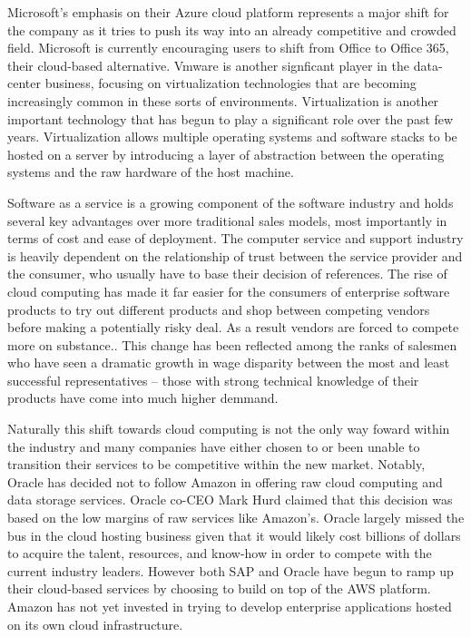 Microsoft's emphasis on their Azure cloud platform represents a major shift for the company as it tries to push its way into an already competitive and crowded field.\autocite[]{OptimismInnovation}
Microsoft is currently encouraging users to shift from Office  to Office 365, their cloud-based alternative.\autocite[]{NextGenBusinessSoftware}
Vmware is another signficant player in the data-center business, focusing on virtualization technologies that are becoming increasingly common in these sorts of environments.\autocite[]{NextGenBusinessSoftware}
Virtualization is another important technology that has begun to play a significant role over the past few years.\autocite[]{LargeParadigmShiftCloudComputing}
Virtualization allows multiple operating systems and software stacks to be hosted on a server by introducing a layer of abstraction between the operating systems and the raw hardware of the host machine.\autocite[]{LargeParadigmShiftCloudComputing}

Software as a service is a growing component of the software industry and holds several key advantages over more traditional sales models, most importantly in terms of cost and ease of deployment.\autocite[]{GrowthTrendsSoftwareService}\autocite[]{TransitionPhaseEnterpriseApplication}
The computer service and support industry is heavily dependent on the relationship of trust between the service provider and the consumer, who usually have to base their decision of references.\autocite[9]{buxmann2012software}
The rise of cloud computing has made it far easier for the consumers of enterprise software products to try out different products and shop between competing vendors before making a potentially risky deal.\autocite[29]{LiquidLunch}
As a result vendors are forced to compete more on substance.\autocite[29]{LiquidLunch}.
This change has been reflected among the ranks of salesmen who have seen a dramatic growth in wage disparity between the most and least successful representatives -- those with strong technical knowledge of their products have come into much higher demmand.\autocite[30]{LiquidLunch}

Naturally this shift towards cloud computing is not the only way foward within the industry and many companies have either chosen to or been unable to transition their services to be competitive within the new market.
Notably, Oracle has decided not to follow Amazon in offering raw cloud computing and data storage services.
Oracle co-CEO Mark Hurd claimed that this decision was based on the low margins of raw services like Amazon's.\autocite[]{OracleCloudNotAWS}
Oracle largely missed the bus in the cloud hosting business given that it would likely cost billions of dollars to acquire the talent, resources, and know-how in order to compete with the current industry leaders.\autocite[]{OracleCloudNotAWS}
However both SAP and Oracle have begun to ramp up their cloud-based services by choosing to build on top of the AWS platform.\autocite[]{OracleCloudNotAWS}
Amazon has not yet invested in trying to develop enterprise applications hosted on its own cloud infrastructure.

